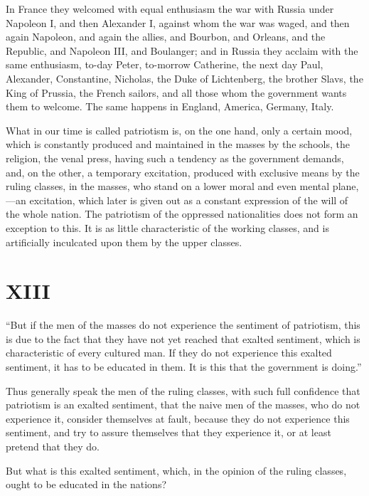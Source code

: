 \documentclass{book}
\begin{document}
In France they welcomed with equal enthusiasm the war with Russia under Napoleon I, and then Alexander I, against whom the war was waged, and then again Napoleon, and again the allies, and Bourbon, and Orleans, and the Republic, and Napoleon III, and Boulanger; and in Russia they acclaim with the same enthusiasm, to-day Peter, to-morrow Catherine, the next day Paul, Alexander, Constantine, Nicholas, the Duke of Lichtenberg, the brother Slavs, the King of Prussia, the French sailors, and all those whom the government wants them to welcome. The same happens in England, America, Germany, Italy.

What in our time is called patriotism is, on the one hand, only a certain mood, which is constantly produced and maintained in the masses by the schools, the religion, the venal press, having such a tendency as the government demands, and, on the other, a temporary excitation, produced with exclusive means by the ruling classes, in the masses, who stand on a lower moral and even mental plane,—an excitation, which later is given out as a constant expression of the will of the whole nation. The patriotism of the oppressed nationalities does not form an exception to this. It is as little characteristic of the working classes, and is artificially inculcated upon them by the upper classes.

\chapter{XIII}
\label{chapter-13}
“But if the men of the masses do not experience the sentiment of patriotism, this is due to the fact that they have not yet reached that exalted sentiment, which is characteristic of every cultured man. If they do not experience this exalted sentiment, it has to be educated in them. It is this that the government is doing.”

Thus generally speak the men of the ruling classes, with such full confidence that patriotism is an exalted sentiment, that the naive men of the masses, who do not experience it, consider themselves at fault, because they do not experience this sentiment, and try to assure themselves that they experience it, or at least pretend that they do.

But what is this exalted sentiment, which, in the opinion of the ruling classes, ought to be educated in the nations?
\end{document}
